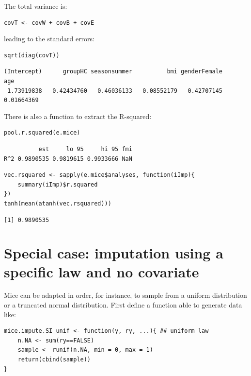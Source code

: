 \documentclass[12pt]{article}
\begin{document}
The total variance is:
\lstset{language=r,label= ,caption= ,captionpos=b,numbers=none}
\begin{lstlisting}
covT <- covW + covB + covE
\end{lstlisting}

leading to the standard errors:
\lstset{language=r,label= ,caption= ,captionpos=b,numbers=none}
\begin{lstlisting}
sqrt(diag(covT))
\end{lstlisting}
\begin{verbatim}
(Intercept)      groupHC seasonsummer          bmi genderFemale          age 
 1.73919838   0.42434760   0.46036133   0.08552179   0.42707145   0.01664369
\end{verbatim}


\bigskip

There is also a function to extract the R-squared:
\lstset{language=r,label= ,caption= ,captionpos=b,numbers=none}
\begin{lstlisting}
pool.r.squared(e.mice)
\end{lstlisting}

\begin{verbatim}
          est     lo 95     hi 95 fmi
R^2 0.9890535 0.9819615 0.9933666 NaN
\end{verbatim}

\lstset{language=r,label= ,caption= ,captionpos=b,numbers=none}
\begin{lstlisting}
vec.rsquared <- sapply(e.mice$analyses, function(iImp){
    summary(iImp)$r.squared
})
tanh(mean(atanh(vec.rsquared)))
\end{lstlisting}

\begin{verbatim}
[1] 0.9890535
\end{verbatim}

\clearpage

\section{Special case: imputation using a specific law and no covariate}
\label{sec:org663d68f}
Mice can be adapted in order, for instance, to sample from a uniform
distribution or a truncated normal distribution. First define a
function able to generate data like:
\lstset{language=r,label= ,caption= ,captionpos=b,numbers=none}
\begin{lstlisting}
mice.impute.SI_unif <- function(y, ry, ...){ ## uniform law
    n.NA <- sum(ry==FALSE)
    sample <- runif(n.NA, min = 0, max = 1)
    return(cbind(sample))
}
\end{lstlisting}
\end{document}
